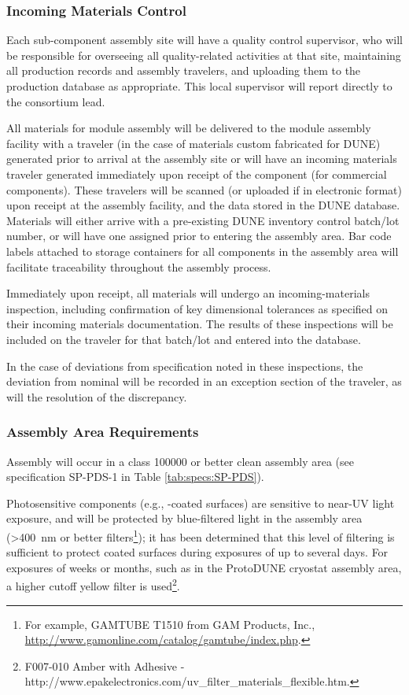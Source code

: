 \subsubsection{Incoming Materials Control}

Each  sub-component assembly site will have a quality control supervisor, who will be responsible for overseeing all quality-related activities at that site, maintaining all production records and assembly travelers, and uploading them to the production database as appropriate.   This local supervisor will report directly to the  consortium lead.

All materials for  module assembly will be delivered to the  module assembly facility with a  traveler (in the case of materials custom fabricated for DUNE) generated prior to arrival at the assembly site or will have an incoming materials traveler generated immediately upon receipt of the component (for commercial components).  These travelers will be scanned (or uploaded if in electronic format) upon receipt at the assembly facility, and the data stored in the DUNE  database.  Materials will either arrive with a pre-existing DUNE inventory control batch/lot number, or will have one assigned prior to entering the assembly area.  Bar code labels attached to storage containers for all components in the assembly area will facilitate traceability throughout the assembly process.

Immediately upon receipt, all materials will undergo an incoming-materials inspection, including confirmation of key dimensional tolerances as specified on their incoming materials documentation.  
The results of these inspections will be included on the traveler for that batch/lot and entered into the database.

In the case of deviations from specification noted in these inspections, the deviation from nominal will be recorded in an exception section of the traveler, as will the resolution of the discrepancy.

\subsubsection{Assembly Area Requirements}

Assembly will occur in a class \num{100000} or better clean assembly area (see specification SP-PDS-1 in Table \ref{tab:specs:SP-PDS}).  

Photosensitive components (e.g., -coated surfaces) are sensitive to near-UV light exposure, and will be protected by blue-filtered light in the assembly area (>\SI{400}{nm} or better filters\footnote{For example, GAMTUBE T1510\texttrademark{} from GAM Products, Inc., \url{http://www.gamonline.com/catalog/gamtube/index.php}.}); it has been determined that this level of filtering is sufficient to protect coated surfaces during  exposures of up to several days. For exposures of weeks or months, such as in the ProtoDUNE cryostat assembly area, a higher cutoff yellow filter is used\footnote{F007-010\texttrademark{} Amber with Adhesive - http://www.epakelectronics.com/uv\_filter\_materials\_flexible.htm.}. 

